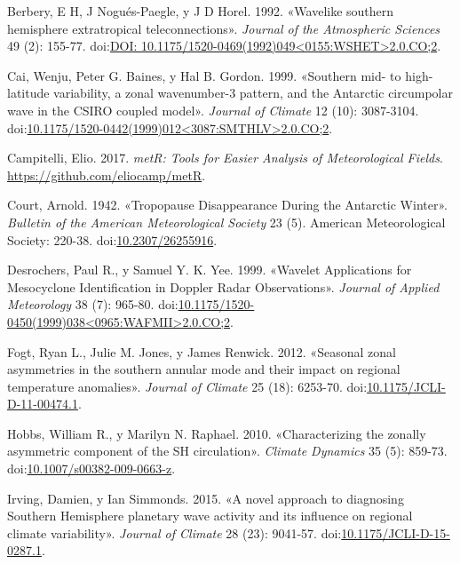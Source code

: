 \documentclass[spanish,a4paper,12p]{book}
\begin{document}
\hypertarget{ref-Berbery1992}{}
Berbery, E H, J Nogués-Paegle, y J D Horel. 1992. «Wavelike southern
hemisphere extratropical teleconnections». \emph{Journal of the
Atmospheric Sciences} 49 (2): 155-77.
doi:\href{https://doi.org/DOI:\%2010.1175/1520-0469(1992)049\%3C0155:WSHET\%3E2.0.CO;2}{DOI: 10.1175/1520-0469(1992)049\textless{}0155:WSHET\textgreater{}2.0.CO;2}.

\hypertarget{ref-Cai1999}{}
Cai, Wenju, Peter G. Baines, y Hal B. Gordon. 1999. «Southern mid- to
high-latitude variability, a zonal wavenumber-3 pattern, and the
Antarctic circumpolar wave in the CSIRO coupled model». \emph{Journal of
Climate} 12 (10): 3087-3104.
doi:\href{https://doi.org/10.1175/1520-0442(1999)012\%3C3087:SMTHLV\%3E2.0.CO;2}{10.1175/1520-0442(1999)012\textless{}3087:SMTHLV\textgreater{}2.0.CO;2}.

\hypertarget{ref-R-metR}{}
Campitelli, Elio. 2017. \emph{metR: Tools for Easier Analysis of
Meteorological Fields}. \url{https://github.com/eliocamp/metR}.

\hypertarget{ref-Court1942}{}
Court, Arnold. 1942. «Tropopause Disappearance During the Antarctic
Winter». \emph{Bulletin of the American Meteorological Society} 23 (5).
American Meteorological Society: 220-38.
doi:\href{https://doi.org/10.2307/26255916}{10.2307/26255916}.

\hypertarget{ref-Desrochers1999}{}
Desrochers, Paul R., y Samuel Y. K. Yee. 1999. «Wavelet Applications for
Mesocyclone Identification in Doppler Radar Observations». \emph{Journal
of Applied Meteorology} 38 (7): 965-80.
doi:\href{https://doi.org/10.1175/1520-0450(1999)038\%3C0965:WAFMII\%3E2.0.CO;2}{10.1175/1520-0450(1999)038\textless{}0965:WAFMII\textgreater{}2.0.CO;2}.

\hypertarget{ref-Fogt2012}{}
Fogt, Ryan L., Julie M. Jones, y James Renwick. 2012. «Seasonal zonal
asymmetries in the southern annular mode and their impact on regional
temperature anomalies». \emph{Journal of Climate} 25 (18): 6253-70.
doi:\href{https://doi.org/10.1175/JCLI-D-11-00474.1}{10.1175/JCLI-D-11-00474.1}.

\hypertarget{ref-Hobbs2010}{}
Hobbs, William R., y Marilyn N. Raphael. 2010. «Characterizing the
zonally asymmetric component of the SH circulation». \emph{Climate
Dynamics} 35 (5): 859-73.
doi:\href{https://doi.org/10.1007/s00382-009-0663-z}{10.1007/s00382-009-0663-z}.

\hypertarget{ref-Irving2015}{}
Irving, Damien, y Ian Simmonds. 2015. «A novel approach to diagnosing
Southern Hemisphere planetary wave activity and its influence on
regional climate variability». \emph{Journal of Climate} 28 (23):
9041-57.
doi:\href{https://doi.org/10.1175/JCLI-D-15-0287.1}{10.1175/JCLI-D-15-0287.1}.
\end{document}
